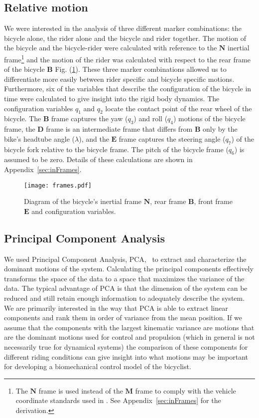 \documentclass[smallextended]{svjour3}     %
\begin{document}
\subsection{Relative motion}
\label{sec:relativeMotion}
We were interested in the analysis of three different marker combinations: the
bicycle alone, the rider alone and the bicycle and rider together. The motion of the bicycle and the
bicycle-rider were calculated with reference to the $\mathbf{N}$ inertial
frame\footnote[1]{The $\mathbf{N}$ frame is used instead of the $\mathbf{M}$ frame
to comply with the vehicle coordinate standards used in \cite{Meijaard2007}. See
Appendix~\ref{sec:inFrames} for the derivation.} and the motion of the rider was calculated
with respect to the rear frame of
the bicycle $\mathbf{B}$ Fig. (\ref{fig:frames}). These three marker
combinations allowed us to differentiate more easily between rider specific and
bicycle specific motions. Furthermore, six of the variables that describe the
configuration of the bicycle in time were calculated to give insight into the
rigid body dynamics. The configuration variables $q_1$ and $q_2$ locate the
contact point of the rear wheel of the bicycle. The $\mathbf{B}$ frame captures
the yaw ($q_3$) and roll ($q_4$) motions
of the bicycle frame, the $\mathbf{D}$ frame is an intermediate frame that
differs from $\mathbf{B}$ only by the bike's headtube angle ($\lambda$), and the
$\mathbf{E}$ frame captures the steering angle ($q_7$) of the bicycle fork relative to
the bicycle frame. The pitch of the bicycle frame ($q_6$) is assumed to be zero. Details of these calculations are shown in
Appendix~\ref{sec:inFrames}.
\begin{figure}[tbp]
    \begin{center}
        \texttt{[image: frames.pdf]}
    \end{center}
    \caption{Diagram of the bicycle's inertial frame $\mathbf{N}$, rear frame $\mathbf{B}$, front frame $\mathbf{E}$ and configuration variables.}
    \label{fig:frames}
\end{figure}

\subsection{Principal Component Analysis}
\label{sec:pca}
We used Principal Component Analysis, PCA,~\cite{Jolliffe2002} to extract and
characterize the dominant motions of the system. Calculating the principal
components effectively transforms the space of the data to a space that
maximizes the variance of the data. The typical advantage of PCA is that the
dimension of the system can be reduced and still retain enough information to
adequately describe the system. We are primarily interested in the way that PCA
is able to extract linear components and rank them in order of variance from
the mean position. If we assume that the components with the largest kinematic
variance are motions that are the dominant motions used for control and
propulsion (which in general is not necessarily true for dynamical systems) the
comparison of these components for different riding conditions can give insight
into what motions may be important for developing a biomechanical control model
of the bicyclist.
\end{document}
